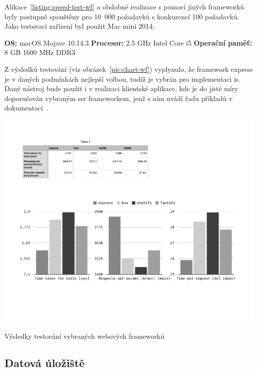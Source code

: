 Alikace~\ref{listing:speed-test-wf} a obdobné realizace s pomocí jiných frameworků byly postupně spouštěny pro 10~000 požadavků s konkurencí 100 požadavků. Jako testovací zařízení byl použit Mac mini 2014:

\textbf{OS:} macOS Mojave 10.14.3\newline
\textbf{Procesor:} 2.5 GHz Intel Core i5\newline
\textbf{Operační paměť:} 8 GB 1600 MHz DDR3

Z výsledků testování (viz obrázek~\ref{pic:chart-wf}) vyplynulo, že framework express je v daných podmínkách nejlepší volbou, tudíž je vybrán pro implementaci \gls{is}. Daný nástroj bude použit i v realizaci klientské aplikace, kde je do jisté míry doporučován vybraným \gls{ssr} frameworkem, jenž s ním uvádí řadu příkladů v dokumentaci~\cite{nextExpress}.


\begin{fig:illustration}
   \includegraphics[width=1\textwidth]{images/chart-wf.pdf}
   \caption{Výsledky testování vybraných webových frameworků}\label{pic:chart-wf}
\end{fig:illustration}




\subsection{Datová úložiště}

